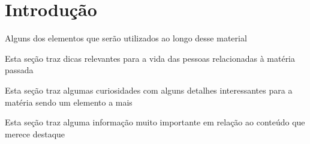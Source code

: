 \chapter{Introdução}
    Alguns dos elementos que serão utilizados ao longo desse material
\begin{ficadica}
    Esta seção traz dicas relevantes para a vida das pessoas relacionadas à matéria passada
\end{ficadica}
\begin{saibamais}
    Esta seção traz algumas curiosidades com alguns detalhes interessantes para a matéria sendo um elemento a mais
\end{saibamais}
\begin{atencao}
    Esta seção traz alguma informação muito importante em relação ao conteúdo que merece destaque
\end{atencao}
